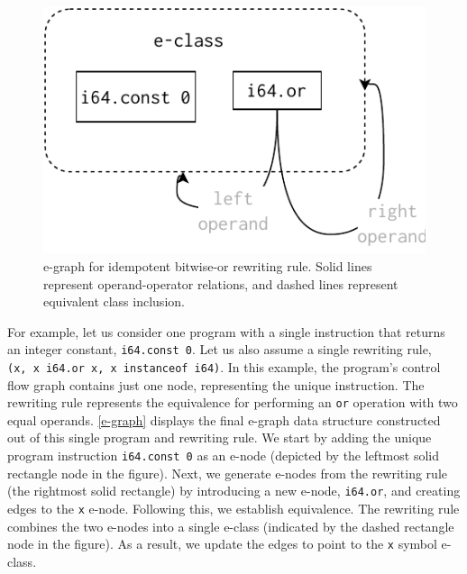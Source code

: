 \documentclass[a4paper,fleqn]{cas-dc}
\newcommand*\badge[1]{ \colorbox{red}{\color{white}#1}}
\newcommand{\todo}[1]{%
\refstepcounter{todo}
\noindent\textbf{\badge{TODO}} {\color{red}#1}
\addcontentsline{td}{todo}
{\color{red}\thesection.\thetodo\xspace #1}}
\begin{document}
\begin{figure}
    \centering
    \includegraphics[width=1.0\linewidth]{figures/egraph1.pdf}
    \caption{e-graph for idempotent bitwise-or rewriting rule. Solid lines represent operand-operator relations, and dashed lines represent equivalent class inclusion. }
  \label{e-graph}
\end{figure}

For example, let us consider one program with a single instruction that returns an integer constant, \texttt{i64.const 0}. Let us also assume a single rewriting rule, \texttt{(x,\ x\ i64.or\ x, x instanceof i64)}. 
In this example, the program's control flow graph contains just one node, representing the unique instruction.
The rewriting rule represents the equivalence for performing an \texttt{or} operation with two equal operands.
\autoref{e-graph} displays the final e-graph data structure constructed out of this single program and rewriting rule. 
We start by adding the unique program instruction \texttt{i64.const 0} as an e-node (depicted by the leftmost solid rectangle node in the figure). 
Next, we generate e-nodes from the rewriting rule (the rightmost solid rectangle) by introducing a new e-node, \texttt{i64.or}, and creating edges to the \texttt{x} e-node.
Following this, we establish equivalence. 
The rewriting rule combines the two e-nodes into a single e-class (indicated by the dashed rectangle node in the figure). 
As a result, we update the edges to point to the \texttt{x} symbol e-class.

\end{document}
